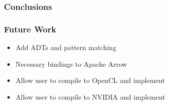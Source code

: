 \documentclass{beamer}
\begin{document}
\begin{frame}
\frametitle{Conclusions}

\end{frame}


\begin{frame}
\frametitle{Future Work}
\begin{itemize}
    \item Add ADTs and pattern matching
    \item Necessary bindings to Apache Arrow
    \item Allow user to compile to OpenCL and implement
    \item Allow user to compile to NVIDIA and implement
\end{itemize}
\end{frame}



\end{document}
